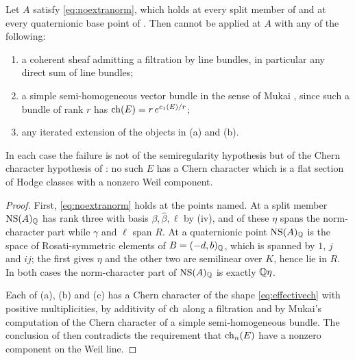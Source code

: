\begin{corollary}\label{cor:nofiltered}
Let $A$ satisfy \eqref{eq:noextranorm}, which holds at every split member of
 and at every quaternionic base point of
. Then  cannot be applied at $A$
with any of the following:
\begin{enumerate}[label=\textup{(\alph*)},nosep]
\item a coherent sheaf admitting a filtration by line bundles, in particular
  any direct sum of line bundles;
\item a simple semi-homogeneous vector bundle in the sense of Mukai
  \cite{Muk78}, since such a bundle of rank $r$ has $\operatorname{ch}(E)=r\,e^{c_{1}(E)/r}$;
\item any iterated extension of the objects in (a) and (b).
\end{enumerate}
In each case the failure is not of the semiregularity hypothesis but of the
Chern character hypothesis of : no such $E$ has a Chern
character which is a flat section of Hodge classes with a nonzero Weil
component.
\end{corollary}

\begin{proof}
First, \eqref{eq:noextranorm} holds at the points named. At a split member
$\mathrm{NS}(A)_{\mathbb{Q}}$ has rank three with basis $\beta,\widehat\beta,\ell$ by
(iv), and of these $\eta$ spans the norm-character part
while $\gamma$ and $\ell$ span $R$. At a quaternionic point $\mathrm{NS}(A)_{\mathbb{Q}}$ is
the space of Rosati-symmetric elements of $B=(-d,b)_{\mathbb{Q}}$, which is spanned
by $1$, $j$ and $ij$; the first gives $\eta$ and the other two are semilinear
over $K$, hence lie in $R$. In both cases the norm-character part of
$\mathrm{NS}(A)_{\mathbb{Q}}$ is exactly $\mathbb{Q}\eta$.

Each of (a), (b) and (c) has a Chern character of the shape
\eqref{eq:effectivech} with positive multiplicities, by additivity of $\operatorname{ch}$
along a filtration and by Mukai's computation of the Chern character of a
simple semi-homogeneous bundle. The conclusion of  then
contradicts the requirement that $\operatorname{ch}_{n}(E)$ have a nonzero component on the
Weil line.
\end{proof}

